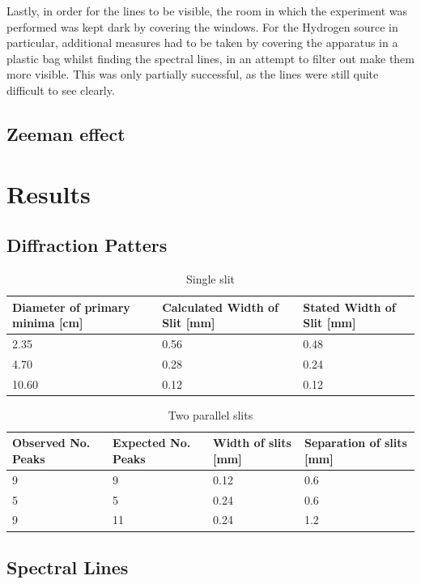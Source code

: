 \documentclass[11pt,a4paper]{article}
\begin{document}
    Lastly, in order for the lines to be visible, the room in which the experiment was performed was kept dark by covering the windows. For the Hydrogen source in particular, additional measures had to be taken by covering the apparatus in a plastic bag whilst finding the spectral lines, in an attempt to filter out make them more visible. This was only partially successful, as the lines were still quite difficult to see clearly.

    \subsection{Zeeman effect}

\section{\label{sect:results}Results}
    \subsection{Diffraction Patters}

    \begin{table}[H]
        \center
        \caption{Single slit}
         \begin{tabular}{l l l}
            Diameter of primary minima [cm] & Calculated Width of Slit [mm] & Stated Width of Slit [mm] \\ \hline
            2.35 & 0.56 & 0.48 \\ 
            4.70 & 0.28 & 0.24 \\
            10.60 & 0.12 & 0.12
         \end{tabular}
         \label{tab:singleslit}
    \end{table}

    \begin{table}[H]
        \center
        \caption{Two parallel slits}
         \begin{tabular}{l l l l}
            Observed No. Peaks & Expected No. Peaks & Width of slits [mm] & Separation of slits [mm] \\ \hline
            9 & 9 & 0.12 & 0.6 \\
            5 & 5 & 0.24 & 0.6 \\
            9 & 11 & 0.24 & 1.2 
         \end{tabular}
         \label{tab:paraslit}
    \end{table}

    \subsection{\label{subsect:spectral}Spectral Lines}
    
\end{document}
